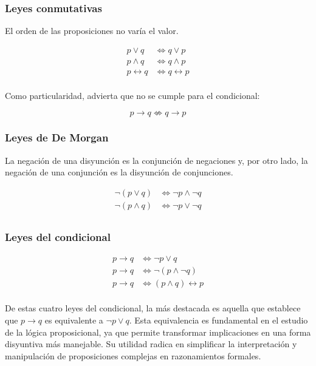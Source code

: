 \subsubsection{Leyes conmutativas}

El orden de las proposiciones no varía el valor.

\begin{align*}
  p \lor q &\iff q \lor p \\
  p \land q &\iff q \land p \\
  p \leftrightarrow q &\iff q \leftrightarrow p \\
\end{align*}

\noindent Como particularidad, advierta que no se cumple para el
condicional:

$$ p \to q \not\iff q \to p $$




\subsubsection{Leyes de De Morgan}

La negación de una disyunción es la conjunción de negaciones y, por otro
lado, la negación de una conjunción es la disyunción de conjunciones.

\begin{align*}
  \neg(p \lor q) &\iff \neg p \land \neg q \\
  \neg(p \land q) &\iff \neg p \lor \neg q \\
\end{align*}




\subsubsection{Leyes del condicional}

\begin{align*}
  p \rightarrow q &\iff \neg p \lor q \\
  p \rightarrow q &\iff \neg(p \land \neg q) \\
  p \rightarrow q &\iff (p \land q) \leftrightarrow p \\
\end{align*}

De estas cuatro leyes del condicional, la más destacada es aquella que
establece que $p \to q$ es equivalente a $\neg p \lor q$. Esta equivalencia
es fundamental en el estudio de la lógica proposicional, ya que permite
transformar implicaciones en una forma disyuntiva más manejable. Su utilidad
radica en simplificar la interpretación y manipulación de proposiciones
complejas en razonamientos formales.

